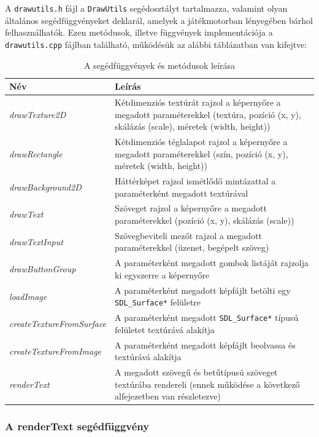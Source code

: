 A \verb|drawutils.h| fájl a \verb|DrawUtils| segédosztályt tartalmazza, valamint olyan általános segédfüggvényeket deklarál, amelyek a játékmotorban lényegében bárhol felhasználhatók. Ezen metódusok, illetve függvények implementációja a \verb|drawutils.cpp| fájlban található, működésük az alábbi táblázatban van kifejtve:

\begin{table}[H]
	\centering
	\begin{tabular}{ | m{} | m{} | }
		\hline
		\textbf{Név} & \textbf{Leírás} \\
		\hline \hline
		\emph{drawTexture2D} & Kétdimenziós textúrát rajzol a képernyőre a megadott paraméterekkel (textúra, pozíció (x, y), skálázás (scale), méretek (width, height)) \\
		\hline
		\emph{drawRectangle} & Kétdimenziós téglalapot rajzol a képernyőre a megadott paraméterekkel (szín, pozíció (x, y), méretek (width, height)) \\
		\hline
		\emph{drawBackground2D} & Háttérképet rajzol ismétlődő mintázattal a paraméterként megadott textúrával \\
		\hline
		\emph{drawText} & Szöveget rajzol a képernyőre a megadott paraméterekkel (pozíció (x, y), skálázás (scale)) \\
		\hline
		\emph{drawTextInput} & Szövegbeviteli mezőt rajzol a megadott paraméterekkel (üzenet, begépelt szöveg) \\
		\hline
		\emph{drawButtonGroup} & A paraméterként megadott gombok listáját rajzolja ki egyszerre a képernyőre \\
		\hline
		\emph{loadImage} & A paraméterként megadott képfájlt betölti egy \verb|SDL_Surface*| felületre \\
		\hline
		\emph{createTextureFromSurface} & A paraméterként megadott \verb|SDL_Surface*| típusú felületet textúrává alakítja \\
		\hline
		\emph{createTextureFromImage} & A paraméterként megadott képfájlt beolvassa és textúrává alakítja \\
		\hline
		\emph{renderText} & A megadott szövegű és betűtípusú szöveget textúrába rendereli (ennek működése a következő alfejezetben van részletezve) \\
		\hline
	\end{tabular}
	\caption{A segédfüggvények és metódusok leírása}
	\label{tab:example-1}
\end{table}

\subsubsection{A renderText segédfüggvény}

